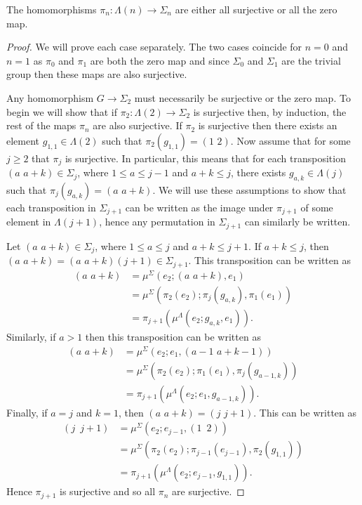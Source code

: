 \documentclass{amsbook} %
\newcommand{\trans}[2]{( #1 \, \, #2 )}
\numberwithin{section}{chapter}
\begin{document}
\begin{prop}\label{surjortriv}
The homomorphisms $\pi_n \colon \Lambda(n) \rightarrow \Sigma_n$ are either all surjective or all the zero map.
\end{prop}
\begin{proof}
We will prove each case separately. The two cases coincide for $n = 0$ and $n = 1$ as $\pi_0$ and $\pi_1$ are both the zero map and since $\Sigma_0$ and $\Sigma_1$ are the trivial group then these maps are also surjective.

Any homomorphism $G \rightarrow \Sigma_2$ must necessarily be surjective or the zero map. To begin we will show that if $\pi_2 \colon \Lambda(2) \rightarrow \Sigma_2$ is surjective then, by induction, the rest of the maps $\pi_n$ are also surjective. If $\pi_2$ is surjective then there exists an element $g_{1,1} \in \Lambda(2)$ such that $\pi_2(g_{1,1}) = \trans{1}{2}$. Now assume that for some $j \geq 2$ that $\pi_j$ is surjective. In particular, this means that for each transposition $\trans{a}{a+k} \in \Sigma_j$, where $1 \leq a \leq j-1$ and $a + k \leq j$, there exists $g_{a,k} \in \Lambda(j)$ such that $\pi_j(g_{a,k}) = \trans{a}{a+k}$. We will use these assumptions to show that each transposition in $\Sigma_{j+1}$ can be written as the image under $\pi_{j+1}$ of some element in $\Lambda(j+1)$, hence any permutation in $\Sigma_{j+1}$ can similarly be written.


Let $\trans{a}{a+k} \in \Sigma_j$, where $1 \leq a \leq j$ and $a + k \leq j+1$. If $a + k \leq j$, then $\trans{a}{a+k} = \trans{a}{a+k}(j + 1) \in \Sigma_{j+1}$. This transposition can be written as
  \begin{align*}
    \trans{a}{a+k} &= \mu^{\Sigma}(e_2 ; \trans{a}{a+k}, e_1) \\
              &= \mu^{\Sigma}(\pi_2(e_2); \pi_j(g_{a,k}), \pi_1(e_1)) \\
              &= \pi_{j+1}\left(\mu^{\Lambda}(e_2; g_{a,k},e_1)\right).
  \end{align*}
Similarly, if $a > 1$ then this transposition can be written as
  \begin{align*}
   \trans{a}{a+k} &= \mu^{\Sigma}(e_2 ; e_1, \trans{a-1}{a+k-1}) \\
              &= \mu^{\Sigma}(\pi_2(e_2); \pi_1(e_1), \pi_j(g_{a-1,k})) \\
              &= \pi_{j+1}\left(\mu^{\Lambda}(e_2; e_1, g_{a-1,k})\right).
  \end{align*}
Finally, if $a = j$ and $k = 1$, then $\trans{a}{a+k} = \trans{j}{j+1}$. This can be written as
  \begin{align*}
    (j \,\,\, j + 1) &= \mu^{\Sigma}(e_2 ; e_{j-1}, (1 \,\,\, 2)) \\
              &= \mu^{\Sigma}(\pi_2(e_2); \pi_{j-1}(e_{j-1}), \pi_2(g_{1,1})) \\
              &= \pi_{j+1}\left(\mu^{\Lambda}(e_2; e_{j-1}, g_{1,1})\right).
  \end{align*}
Hence $\pi_{j+1}$ is surjective and so all $\pi_n$ are surjective.


\end{proof}
\end{document}
